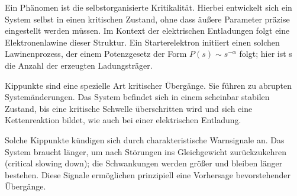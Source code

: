 Ein Phänomen ist die selbstorganisierte Kritikalität. Hierbei entwickelt sich ein System selbst in einen kritischen Zustand, ohne dass äußere Parameter präzise eingestellt werden müssen. Im Kontext der elektrischen Entladungen folgt eine Elektronenlawine dieser Struktur. Ein Starterelektron initiiert einen solchen Lawinenprozess, der einem Potenzgesetz der Form \(P(s) \sim s^{-\alpha}\) folgt; hier ist s die Anzahl der erzeugten Ladungsträger.

Kippunkte sind eine spezielle Art kritischer Übergänge. Sie führen zu abrupten Systemänderungen. Das System befindet sich in einem scheinbar stabilen Zustand, bis eine kritische Schwelle überschritten wird und sich eine Kettenreaktion bildet, wie auch bei einer elektrischen Entladung.

Solche Kippunkte kündigen sich durch charakteristische Warnsignale an. Das System braucht länger, um nach Störungen ins Gleichgewicht zurückzukehren (critical slowing down); die Schwankungen werden größer und bleiben länger bestehen. Diese Signale ermöglichen prinzipiell eine Vorhersage bevorstehender Übergänge. \cite{Scheffer2009}
